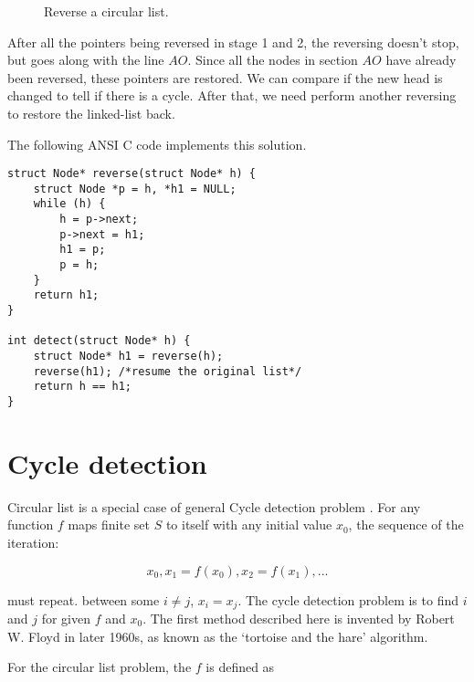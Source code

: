 \documentclass{article}
\begin{document}
\begin{figure}[htbp]
{
}
\caption{Reverse a circular list.}
\label{fig:reverse}
\end{figure}

After all the pointers being reversed in stage 1 and 2, the reversing doesn't
stop, but goes along with the line $AO$. Since all the nodes in section $AO$
have already been reversed, these pointers are restored. We can compare if
the new head is changed to tell if there is a cycle. After that, we need
perform another reversing to restore the linked-list back.

The following ANSI C code implements this solution.

\lstset{language=C}
\begin{lstlisting}
struct Node* reverse(struct Node* h) {
    struct Node *p = h, *h1 = NULL;
    while (h) {
        h = p->next;
        p->next = h1;
        h1 = p;
        p = h;
    }
    return h1;
}

int detect(struct Node* h) {
    struct Node* h1 = reverse(h);
    reverse(h1); /*resume the original list*/
    return h == h1;
}
\end{lstlisting}


\section{Cycle detection}
Circular list is a special case of general Cycle detection problem \cite{wiki-cycle-detection}.
For any function $f$ maps finite set $S$ to itself with any initial value $x_0$, the sequence of the
iteration:

\[
x_0, x_1 = f(x_0), x_2 = f(x_1), ...
\]

must repeat. between some $i \neq j$, $x_i = x_j$. The cycle detection problem is to find $i$ and $j$ for
given $f$ and $x_0$. The first method described here is invented by Robert W. Floyd in later 1960s, as known
as the `tortoise and the hare' algorithm.

For the circular list problem, the $f$ is defined as
\end{document}
